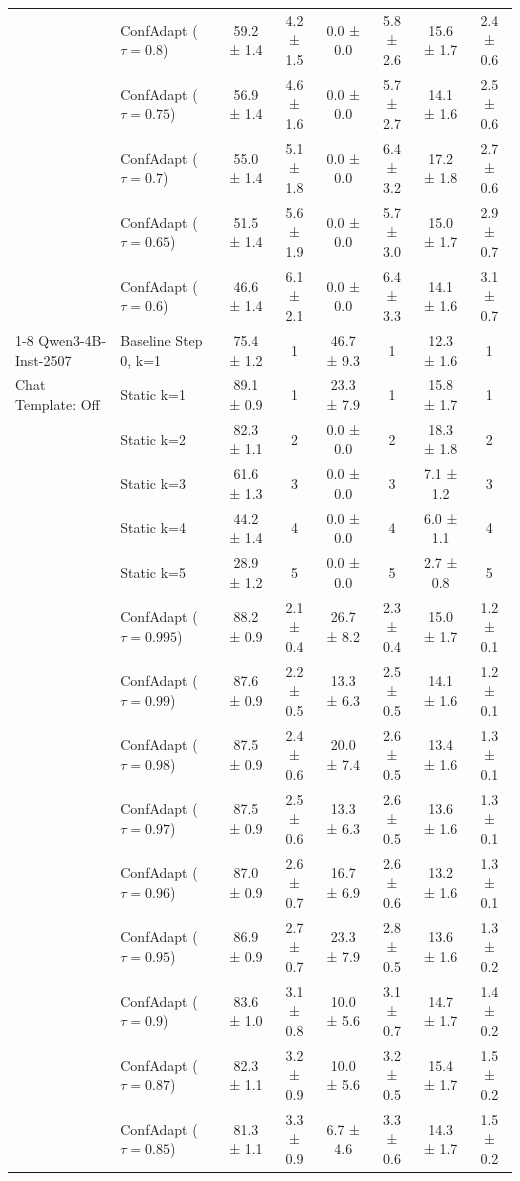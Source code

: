 \documentclass{article}
\theoremstyle{plain}
\theoremstyle{definition}
\theoremstyle{remark}
\begin{document}
\begin{table}[h!]
\begin{tabular}{llcccccc}
 & ConfAdapt ($\tau=0.8$) & 59.2 ± 1.4 & 4.2 ± 1.5 & 0.0 ± 0.0 & 5.8 ± 2.6 & 15.6 ± 1.7 & 2.4 ± 0.6 \\
 & ConfAdapt ($\tau=0.75$) & 56.9 ± 1.4 & 4.6 ± 1.6 & 0.0 ± 0.0 & 5.7 ± 2.7 & 14.1 ± 1.6 & 2.5 ± 0.6 \\
 & ConfAdapt ($\tau=0.7$) & 55.0 ± 1.4 & 5.1 ± 1.8 & 0.0 ± 0.0 & 6.4 ± 3.2 & 17.2 ± 1.8 & 2.7 ± 0.6 \\
 & ConfAdapt ($\tau=0.65$) & 51.5 ± 1.4 & 5.6 ± 1.9 & 0.0 ± 0.0 & 5.7 ± 3.0 & 15.0 ± 1.7 & 2.9 ± 0.7 \\
 & ConfAdapt ($\tau=0.6$) & 46.6 ± 1.4 & 6.1 ± 2.1 & 0.0 ± 0.0 & 6.4 ± 3.3 & 14.1 ± 1.6 & 3.1 ± 0.7 \\
\cline{1-8}
Qwen3-4B-Inst-2507 & Baseline Step 0, k=1 & 75.4 ± 1.2 & 1 & 46.7 ± 9.3 & 1 & 12.3 ± 1.6 & 1 \\
 Chat Template: Off & Static k=1 & 89.1 ± 0.9 & 1 & 23.3 ± 7.9 & 1 & 15.8 ± 1.7 & 1 \\
 & Static k=2 & 82.3 ± 1.1 & 2 & 0.0 ± 0.0 & 2 & 18.3 ± 1.8 & 2 \\
 & Static k=3 & 61.6 ± 1.3 & 3 & 0.0 ± 0.0 & 3 & 7.1 ± 1.2 & 3 \\
 & Static k=4 & 44.2 ± 1.4 & 4 & 0.0 ± 0.0 & 4 & 6.0 ± 1.1 & 4 \\
 & Static k=5 & 28.9 ± 1.2 & 5 & 0.0 ± 0.0 & 5 & 2.7 ± 0.8 & 5 \\
 & ConfAdapt ($\tau=0.995$) & 88.2 ± 0.9 & 2.1 ± 0.4 & 26.7 ± 8.2 & 2.3 ± 0.4 & 15.0 ± 1.7 & 1.2 ± 0.1 \\
 & ConfAdapt ($\tau=0.99$) & 87.6 ± 0.9 & 2.2 ± 0.5 & 13.3 ± 6.3 & 2.5 ± 0.5 & 14.1 ± 1.6 & 1.2 ± 0.1 \\
 & ConfAdapt ($\tau=0.98$) & 87.5 ± 0.9 & 2.4 ± 0.6 & 20.0 ± 7.4 & 2.6 ± 0.5 & 13.4 ± 1.6 & 1.3 ± 0.1 \\
 & ConfAdapt ($\tau=0.97$) & 87.5 ± 0.9 & 2.5 ± 0.6 & 13.3 ± 6.3 & 2.6 ± 0.5 & 13.6 ± 1.6 & 1.3 ± 0.1 \\
 & ConfAdapt ($\tau=0.96$) & 87.0 ± 0.9 & 2.6 ± 0.7 & 16.7 ± 6.9 & 2.6 ± 0.6 & 13.2 ± 1.6 & 1.3 ± 0.1 \\
 & ConfAdapt ($\tau=0.95$) & 86.9 ± 0.9 & 2.7 ± 0.7 & 23.3 ± 7.9 & 2.8 ± 0.5 & 13.6 ± 1.6 & 1.3 ± 0.2 \\
 & ConfAdapt ($\tau=0.9$) & 83.6 ± 1.0 & 3.1 ± 0.8 & 10.0 ± 5.6 & 3.1 ± 0.7 & 14.7 ± 1.7 & 1.4 ± 0.2 \\
 & ConfAdapt ($\tau=0.87$) & 82.3 ± 1.1 & 3.2 ± 0.9 & 10.0 ± 5.6 & 3.2 ± 0.5 & 15.4 ± 1.7 & 1.5 ± 0.2 \\
 & ConfAdapt ($\tau=0.85$) & 81.3 ± 1.1 & 3.3 ± 0.9 & 6.7 ± 4.6 & 3.3 ± 0.6 & 14.3 ± 1.7 & 1.5 ± 0.2 \\

\end{tabular}
\end{table}
\end{document}
